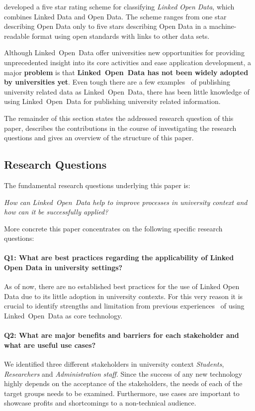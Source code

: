 \documentclass{article}
\begin{document}
\cite{berners-lee_linked_2006} developed a five star rating scheme for classifying \textit{Linked Open Data}, which combines Linked Data and Open Data. The scheme ranges from one star describing Open Data only to five stars describing Open Data in a machine-readable format using open standards with links to other data sets.

Although Linked~Open~Data offer universities new opportunities for providing unprecedented insight into its core activities and ease application development, a major \textbf{problem} is that \textbf{Linked~Open~Data has not been widely adopted by universities yet}. Even tough there are a few examples~\cite{daquin_members_2014} of publishing university related data as Linked~Open~Data, there has been little knowledge of using Linked~Open~Data for publishing university related information. 

The remainder of this section states the addressed research question of this paper, describes the contributions in the course of investigating the research questions and gives an overview of the structure of this paper.


\subsection{Research Questions}
\label{introduction:research-questions}
The fundamental research questions underlying this paper is:
\begin{displayquote}
\textit{How can Linked~Open~Data help to improve processes in university context and how can it be successfully applied?}
\end{displayquote}
More concrete this paper concentrates on the following specific research questions:
\paragraph{Q1: What are best practices regarding the applicability of Linked Open Data in university settings?}
As of now, there are no established best practices for the use of Linked Open Data due to its little adoption in university contexts. For this very reason it is crucial to identify strengths and limitation from previous experiences~\cite{daquin_members_2014} of using Linked~Open~Data as core technology. 
\paragraph{Q2: What are major benefits and barriers for each stakeholder and what are useful use cases?}
We identified three different stakeholders in university context \textit{Students}, \textit{Researchers} and \textit{Administration staff}. Since the success of any new technology highly depends on the acceptance of the stakeholders, the needs of each of the target groups needs to be examined. Furthermore, use cases are important to showcase profits and shortcomings to a non-technical audience. 
\end{document}
